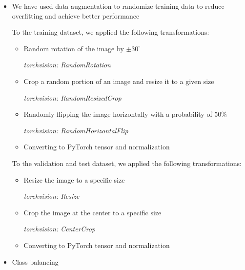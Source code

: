 \documentclass{article}
\begin{document}
\begin{itemize}
\item We have used data augmentation to randomize training data to reduce overfitting and achieve better performance \cite{somewebsite}

To the training dataset, we applied the following transformations: 
\begin{itemize}
\item Random rotation of the image by $\pm30^{\circ}$

\textit{torchvision: RandomRotation} \cite{randomrotation}
\item Crop a random portion of an image and resize it to a given size

\textit{torchvision: RandomResizedCrop} \cite{randomresizedcrop}
\item Randomly flipping the image horizontally with a probability of 50\%

\textit{torchvision: RandomHorizontalFlip} \cite{randomhorizontalflip}
\item Converting to PyTorch tensor and normalization
\end{itemize} 
To the validation and test dataset, we applied the following transformations: 
\begin{itemize}
\item Resize the image to a specific size

\textit{torchvision: Resize} \cite{resize}
\item Crop the image at the center to a specific size

\textit{torchvision: CenterCrop} \cite{centercrop}
\item Converting to PyTorch tensor and normalization
\end{itemize}       
\item Class balancing





\end{itemize}
\end{document}
